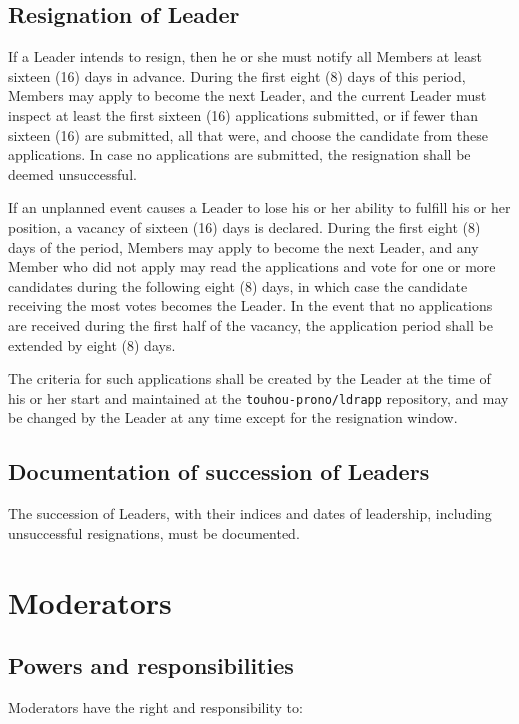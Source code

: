 \documentclass[10pt]{book}
\begin{document}
\subsection{Resignation of Leader}

If a Leader intends to resign, then he or she must notify all Members at least sixteen (16) days in advance. During the first eight (8) days of this period, Members may apply to become the next Leader, and the current Leader must inspect at least the first sixteen (16) applications submitted, or if fewer than sixteen (16) are submitted, all that were, and choose the candidate from these applications. In case no applications are submitted, the resignation shall be deemed unsuccessful.

If an unplanned event causes a Leader to lose his or her ability to fulfill his or her position, a vacancy of sixteen (16) days is declared. During the first eight (8) days of the period, Members may apply to become the next Leader, and any Member who did not apply may read the applications and vote for one or more candidates during the following eight (8) days, in which case the candidate receiving the most votes becomes the Leader. In the event that no applications are received during the first half of the vacancy, the application period shall be extended by eight (8) days.

The criteria for such applications shall be created by the Leader at the time of his or her start and maintained at the \texttt{touhou-prono/ldrapp} repository, and may be changed by the Leader at any time except for the resignation window.

\subsection{Documentation of succession of Leaders}

The succession of Leaders, with their indices and dates of leadership, including unsuccessful resignations, must be documented.

\section{Moderators}

\subsection{Powers and responsibilities}

Moderators have the right and responsibility to:
\end{document}
